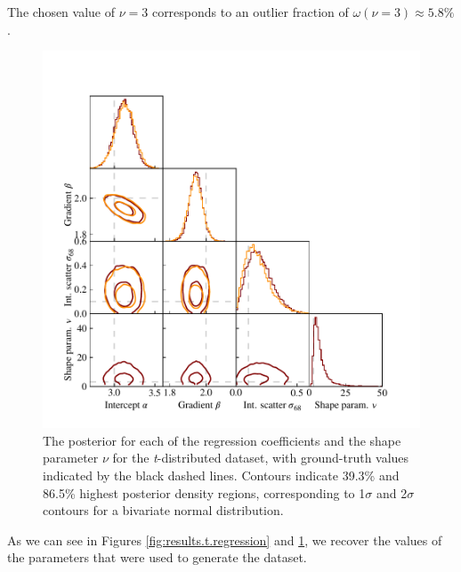 \documentclass[fleqn,usenatbib]{mnras}
\begin{document}
The chosen value of $\nu = 3$ corresponds to an outlier fraction of $\omega(\nu = 3)
\approx 5.8 \%$.


\begin{figure}
    \includegraphics[width=\columnwidth]{graphics/corner_t.pdf}
    \caption{The posterior for each of the regression coefficients and the shape
    parameter $\nu$ for the \textit{t}-distributed dataset, with ground-truth
    values indicated by the black dashed lines. Contours indicate 39.3\% and
    86.5\% highest posterior density regions, corresponding to 1$\sigma$ and
    2$\sigma$ contours for a bivariate normal distribution.}
    \label{fig:results.t.corner}
\end{figure}

As we can see in Figures \ref{fig:results.t.regression} and
\ref{fig:results.t.corner}, we recover the values of the parameters that were
used to generate the dataset.
\end{document}
